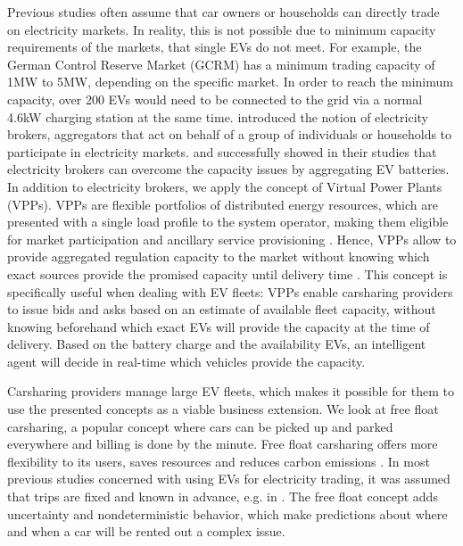 \documentclass[12pt, article]{article}
\begin{document}
Previous studies often assume that car owners or households can directly trade
on electricity markets. In reality, this is not possible due to minimum capacity
requirements of the markets, that single EVs do not meet. For example, the German
Control Reserve Market (GCRM) has a minimum trading capacity of 1MW to 5MW,
depending on the specific market. In order to reach the minimum capacity, over
200 EVs would need to be connected to the grid via a normal 4.6kW charging
station at the same time. \textcite{ketter13_power_tac} introduced the notion of
electricity brokers, aggregators that act on behalf of a group of individuals or
households to participate in electricity markets.
\textcite{brandt17_evaluat_busin_model_vehic_grid_integ} and
\textcite{kahlen14_balan_with_elect_vehic} successfully showed in their studies
that electricity brokers can overcome the capacity issues by aggregating EV
batteries. In addition to electricity brokers, we apply the concept of Virtual
Power Plants (VPPs). VPPs are flexible portfolios of distributed energy
resources, which are presented with a single load profile to the system
operator, making them eligible for market participation and ancillary service
provisioning \parencite{pudjianto07_virtual_power_plant_system_integ}. Hence, VPPs
allow to provide aggregated regulation capacity to the market without knowing
which exact sources provide the promised capacity until delivery time
\parencite{kahlen17_fleet}. This concept is specifically useful when dealing with
EV fleets: VPPs enable carsharing providers to issue bids and asks based on an
estimate of available fleet capacity, without knowing beforehand which exact EVs
will provide the capacity at the time of delivery. Based on the battery charge
and the availability EVs, an intelligent agent will decide in real-time which
vehicles provide the capacity.

Carsharing providers manage large EV fleets, which makes it possible for them to
use the presented concepts as a viable business extension. We look at free float
carsharing, a popular concept where cars can be picked up and parked everywhere
and billing is done by the minute. Free float carsharing offers more flexibility
to its users, saves resources and reduces carbon emissions
\parencite{firnkorn15_free_float_elect_carsh_fleet_smart_cities}. In most previous
studies concerned with using EVs for electricity trading, it was assumed that
trips are fixed and known in advance, e.g. in
\textcite{tomic07_using_fleet_elect_drive_vehic_grid_suppor}. The free float
concept adds uncertainty and nondeterministic behavior, which make predictions
about where and when a car will be rented out a complex issue.
\end{document}

